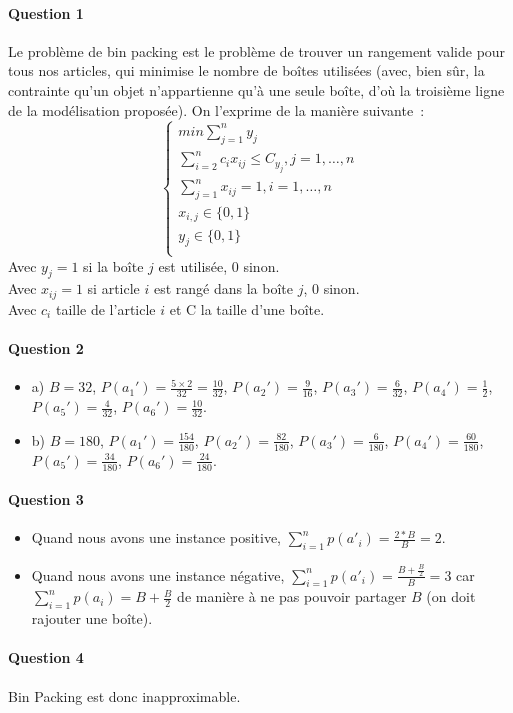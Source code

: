 \paragraph{Question 1}

Le problème de bin packing est le problème de trouver un rangement
valide pour tous nos articles, qui minimise le nombre de boîtes
utilisées (avec, bien sûr, la contrainte qu'un objet n'appartienne
qu'à une seule boîte, d'où la troisième ligne de la modélisation
proposée).  On l'exprime de la manière suivante~:
\begin{equation}
\begin{cases}
min \sum_{j=1}^{n}y_j \\
\sum_{i=2}^{n} c_ix_{ij} \leq C_{y_j}, j = 1, \dots, n \\
\sum_{j=1}^{n}x_{ij}=1, i=1, \dots, n \\
x_{i,j} \in \{ 0,1 \} \\
y_j \in \{ 0,1 \} \\
\end{cases}
\end{equation}
Avec $y_j = 1$ si la boîte $j$ est utilisée, 0 sinon. \\
Avec $x_{ij} = 1 $ si article $i$ est rangé dans la boîte $j$, 0
sinon. \\
Avec $c_i$ taille de l'article $i$ et C la taille d'une boîte.


\paragraph{Question 2}
\begin{itemize}
\item a) $B = 32$, $P(a_1') = \frac{5 \times 2}{32} = \frac{10}{32}$,
  $P(a_2') = \frac{9}{16}$, $P(a_3')=\frac{6}{32}$,
  $P(a_4')=\frac{1}{2}$, $P(a_5')=\frac{4}{32}$, $P(a_6')=\frac{10}{32}$.
\item b) $B = 180$, $P(a_1') = \frac{154}{180}$,
  $P(a_2') = \frac{82}{180}$, $P(a_3')=\frac{6}{180}$,
  $P(a_4')=\frac{60}{180}$, $P(a_5')=\frac{34}{180}$, $P(a_6')=\frac{24}{180}$.
\end{itemize}

\paragraph{Question 3}
\begin{itemize}
\item Quand nous avons une instance positive, $\sum_{i=1}^n p(a'_i) =\frac{2*B}{B}=2$.
\item Quand nous avons une instance négative, $\sum_{i=1}^n p(a'_i)
  =\frac{B+\frac{B}{2}}{B}=3$ car $\sum_{i=1}^n p(a_i)= B+\frac{B}{2}$
  de manière à ne pas pouvoir partager $B$ (on doit rajouter une boîte).
\end{itemize}

\paragraph{Question 4}

Bin Packing est donc inapproximable.


